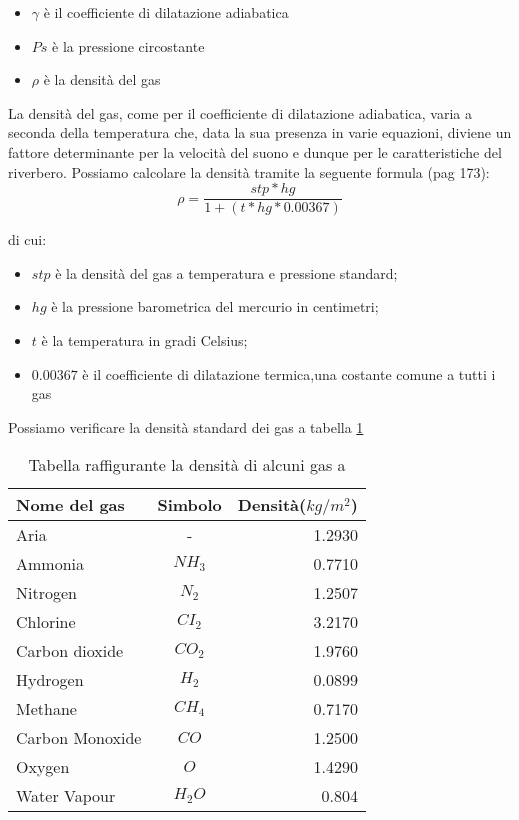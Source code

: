 \begin{itemize}
      \item $\gamma$ è il coefficiente di dilatazione adiabatica
      \item $Ps$ è la pressione circostante
      \item $\rho$ è la densità del gas
\end{itemize}

La densità del gas, come per il coefficiente di dilatazione adiabatica, varia a
seconda della temperatura che, data la sua presenza in varie equazioni, diviene
un fattore determinante per la velocità del suono e dunque per le
caratteristiche del riverbero.
Possiamo calcolare la densità tramite la seguente formula (pag 173):
\begin{equation}
\rho = \frac{stp*hg}{1+(t*hg*0.00367)}
\end{equation}

di cui:

\begin{itemize}
      \item $stp$ è la densità del gas a temperatura e pressione standard;
      \item $hg$ è la pressione barometrica del mercurio in centimetri;
      \item $t$ è la temperatura in gradi Celsius;
      \item $0.00367$ è il  coefficiente di dilatazione termica,una costante comune a tutti i gas
\end{itemize}

Possiamo verificare la densità standard dei gas a tabella \ref{tab:dens}

\bigskip
\begin{table}[h]
\centering
\caption{Tabella raffigurante la densità di alcuni gas a \emph{}}
\label{tab:dens}
\begin{tabular}{lcr}
\toprule
Nome del gas & Simbolo & Densità($kg/m^2$) \\
\midrule
Aria & - & 1.2930 \\
Ammonia & $NH_3$ & 0.7710 \\
Nitrogen & $N_2$ & 1.2507 \\
Chlorine & $CI_2$ & 3.2170 \\
Carbon dioxide & $CO_2$ & 1.9760 \\
Hydrogen & $H_2$ & 0.0899 \\
Methane & $CH_4$ & 0.7170 \\
Carbon Monoxide & $CO$ & 1.2500 \\
Oxygen & $O$ &1.4290 \\
Water Vapour & $H_2O$ & 0.804 \\
\bottomrule
\end{tabular}
\end{table}
\smallskip

